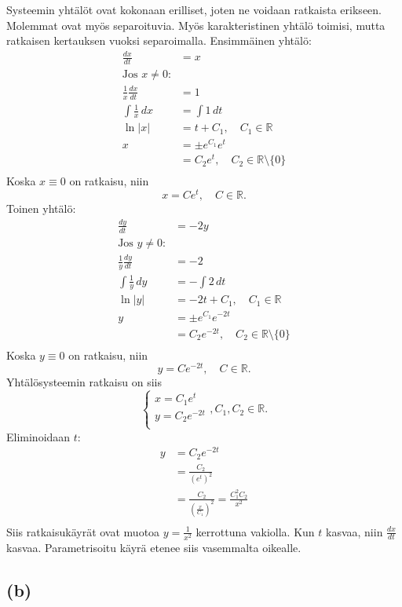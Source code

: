 \documentclass{article}
\begin{document}
Systeemin yhtälöt ovat kokonaan erilliset, joten ne voidaan ratkaista erikseen.
Molemmat ovat myös separoituvia. Myös karakteristinen yhtälö toimisi, mutta
ratkaisen kertauksen vuoksi separoimalla. Ensimmäinen yhtälö:
\begin{align*}
  \frac{dx}{dt} &= x \\
  \text{Jos $x \neq 0$:} \\
  \frac{1}{x}\frac{dx}{dt} &= 1 \\
  \int \frac{1}{x}\,dx &= \int 1\,dt \\
  \ln |x| &= t + C_1, \quad C_1 \in \mathbb{R} \\
  x &= \pm e^{C_1}e^t \\
    &= C_2e^t, \quad C_2 \in \mathbb{R} \setminus \{0\} \\
\end{align*}
Koska $x \equiv 0$ on ratkaisu, niin
\[
  x = Ce^t, \quad C \in \mathbb{R}.
\]
Toinen yhtälö:
\begin{align*}
  \frac{dy}{dt} &= -2y \\
  \text{Jos $y \neq 0$:} \\
  \frac{1}{y}\frac{dy}{dt} &= -2 \\
  \int \frac{1}{y}\,dy &= -\int 2\,dt \\
  \ln |y| &= -2t + C_1, \quad C_1 \in \mathbb{R} \\
  y &= \pm e^{C_1}e^{-2t} \\
    &= C_2e^{-2t}, \quad C_2 \in \mathbb{R} \setminus \{0\} \\
\end{align*}
Koska $y \equiv 0$ on ratkaisu, niin
\[
  y = Ce^{-2t}, \quad C \in \mathbb{R}.
\]
Yhtälösysteemin ratkaisu on siis
\[
  \begin{cases}
    x = C_1e^t \\
    y = C_2e^{-2t} \\
  \end{cases}, C_1,C_2 \in \mathbb{R}.
\]
Eliminoidaan $t$:
\begin{align*}
  y &= C_2e^{-2t} \\
    &= \frac{C_2}{(e^t)^2} \\
    &= \frac{C_2}{(\frac{x}{C_1})^2} = \frac{C_1^2C_2}{x^2} \\
\end{align*}
Siis ratkaisukäyrät ovat muotoa $y = \frac{1}{x^2}$ kerrottuna vakiolla.
Kun $t$ kasvaa, niin $\frac{dx}{dt}$ kasvaa.
Parametrisoitu käyrä etenee siis vasemmalta oikealle.

\subsection*{(b)}
\end{document}
